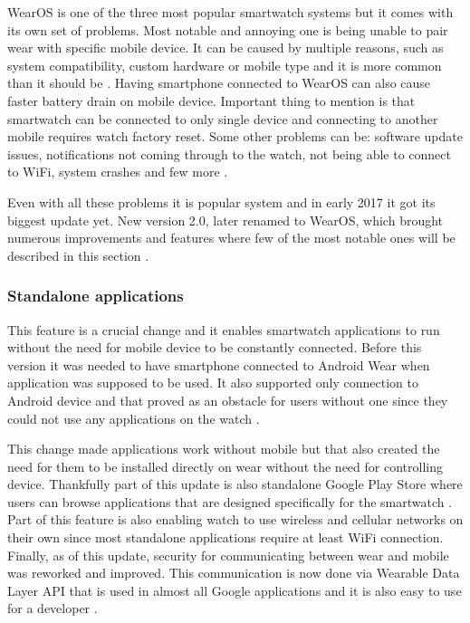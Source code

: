 WearOS is one of the three most popular smartwatch systems but it comes with its own set of problems. Most notable and annoying one is being unable to pair wear with specific mobile device. It can be caused by multiple reasons, such as system compatibility, custom hardware or mobile type and it is more common than it should be \cite{AWPaS}. Having smartphone connected to WearOS can also cause faster battery drain on mobile device. Important thing to mention is that smartwatch can be connected to only single device and connecting to another mobile requires watch factory reset. Some other problems can be: software update issues, notifications not coming through to the watch, not being able to connect to WiFi, system crashes and few more \cite{WAWP}.

Even with all these problems it is popular system and in early 2017 it got its biggest update yet. New version 2.0, later renamed to WearOS, which brought numerous improvements and features where few of the most notable ones will be described in this section \cite{AW2UG, AW2WN, AW2N}.

\subsubsection{Standalone applications}\label{sec:StandaloneApplications}
This feature is a crucial change and it enables smartwatch applications to run without the need for mobile device to be constantly connected. Before this version it was needed to have smartphone connected to Android Wear when application was supposed to be used. It also supported only connection to Android device and that proved as an obstacle for users without one since they could not use any applications on the watch \cite{AW2UG, AW2WN}.

This change made applications work without mobile but that also created the need for them to be installed directly on wear without the need for controlling device. Thankfully part of this update is also standalone Google Play Store where users can browse applications that are designed specifically for the smartwatch \cite{AW2WN}. Part of this feature is also enabling watch to use wireless and cellular networks on their own since most standalone applications require at least WiFi connection. Finally, as of this update, security for communicating between wear and mobile was reworked and improved. This communication is now done via Wearable Data Layer API that is used in almost all Google applications and it is also easy to use for a developer \cite{AW2UG}. 

